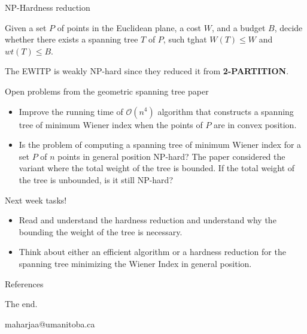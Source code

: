 \documentclass[11pt]{beamer}
\makeatletter
\newcommand{\email}{maharjaa@umanitoba.ca}
\makeatother
\begin{document}
\begin{frame}{NP-Hardness reduction}
	\begin{definition}
		Given a set $P$ of points in the Euclidean plane, a cost $W$, and a budget $B$, decide whether there exists a spanning tree $T$ of $P$, such tghat $W(T) \leq W$ and $wt(T) \leq B$.
	\end{definition}

	\begin{theorem}
		The EWITP is weakly NP-hard since they reduced it from \textbf{2-PARTITION}.
	\end{theorem}
\end{frame}

\begin{frame}{Open problems from the geometric spanning tree paper}
	\begin{itemize}
		\item Improve the running time of $\mathcal{O}(n^4)$ algorithm that constructs a spanning tree of minimum Wiener index when the points of $P$ are in convex position.

		\item Is the problem of computing a spanning tree of minimum Wiener index for a set $P$ of $n$ points in general position NP-hard? The paper considered the variant where the total weight of the tree is bounded. If the total weight of the tree is unbounded, is it still NP-hard?
	\end{itemize}
\end{frame}

\begin{frame}{Next week tasks!}
	\begin{itemize}
		\item Read and understand the hardness reduction and understand why the bounding the weight of the tree is necessary.
		\item Think about either an efficient algorithm or a hardness reduction for the spanning tree minimizing the Wiener Index in general position.
	\end{itemize}
\end{frame}

\begin{frame}[allowframebreaks]{References}
	
\end{frame}

\begin{frame}
	\begin{center}
		The end.

		\email
	\end{center}
\end{frame}
\end{document}
